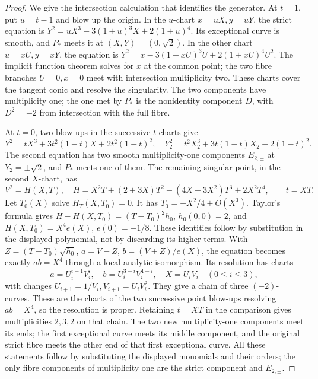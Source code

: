 \begin{proof}
We give the intersection calculation that identifies the generator. At $t=1$, put $u=t-1$ and blow up the origin. In the $u$-chart $x=uX,y=uY$, the strict equation is
$Y^2=uX^3-3(1+u)^3X+2(1+u)^4$. Its exceptional curve is smooth, and $P_*$ meets it at $(X,Y)=(0,\sqrt2)$. In the other chart $u=xU,y=xY$, the equation is $Y^2=x-3(1+xU)^3U+2(1+xU)^4U^2$. The implicit function theorem solves for $x$ at the common point; the two fibre branches $U=0,x=0$ meet with intersection multiplicity two. These charts cover the tangent conic and resolve the singularity. The two components have multiplicity one; the one met by $P_*$ is the nonidentity component $D$, with $D^2=-2$ from intersection with the full fibre.

At $t=0$, two blow-ups in the successive $t$-charts give
\[
 Y^2=tX^3+3t^2(1-t)X+2t^2(1-t)^2,
\quad
 Y_2^2=t^2X_2^3+3t(1-t)X_2+2(1-t)^2.
\]
The second equation has two smooth multiplicity-one components $E_{2,\pm}$ at $Y_2=\pm\sqrt2$, and $P_*$ meets one of them. The remaining singular point, in the second $X$-chart, has
\[
 V^2=H(X,T),\quad H=X^2T+(2+3X)T^2-(4X+3X^2)T^3+2X^2T^4,
 \qquad t=XT.
\]
Let $T_0(X)$ solve $H_T(X,T_0)=0$. It has $T_0=-X^2/4+O(X^3)$. Taylor's formula gives
$H-H(X,T_0)=(T-T_0)^2h_0$, $h_0(0,0)=2$, and $H(X,T_0)=X^4e(X)$, $e(0)=-1/8$. These identities follow by substitution in the displayed polynomial, not by discarding its higher terms. With $Z=(T-T_0)\sqrt{h_0}$, $a=V-Z$, $b=(V+Z)/e(X)$, the equation becomes exactly $ab=X^4$ through a local analytic isomorphism. Its resolution has charts
\[
 a=U_i^{i+1}V_i^i,\quad b=U_i^{3-i}V_i^{4-i},\quad X=U_iV_i
 \quad(0\le i\le3),
\]
with changes $U_{i+1}=1/V_i,V_{i+1}=U_iV_i^2$. They give a chain of three $(-2)$-curves. These are the charts of the two successive point blow-ups resolving $ab=X^4$, so the resolution is proper. Retaining $t=XT$ in the comparison gives multiplicities $2,3,2$ on that chain. The two new multiplicity-one components meet its ends; the first exceptional curve meets its middle component, and the original strict fibre meets the other end of that first exceptional curve. All these statements follow by substituting the displayed monomials and their orders; the only fibre components of multiplicity one are the strict component and $E_{2,\pm}$.


\end{proof}
